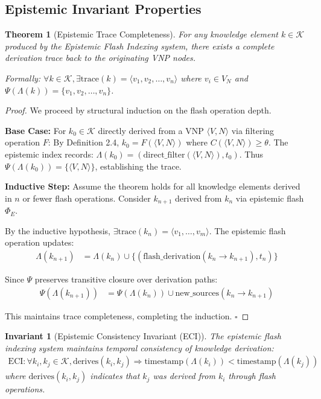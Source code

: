 \documentclass[12pt]{article}
\newtheorem{theorem}{Theorem}
\newtheorem{invariant}{Invariant}
\begin{document}
\subsection{Epistemic Invariant Properties}

\begin{theorem}[Epistemic Trace Completeness]
For any knowledge element $k \in \mathcal{K}$ produced by the Epistemic Flash Indexing system, there exists a complete derivation trace back to the originating VNP nodes.

Formally: $\forall k \in \mathcal{K}, \exists \text{trace}(k) = \langle v_1, v_2, \ldots, v_n \rangle$ where $v_i \in V_N$ and $\Psi(\Lambda(k)) = \{v_1, v_2, \ldots, v_n\}$.
\end{theorem}

\begin{proof}
We proceed by structural induction on the flash operation depth.

\textbf{Base Case:} For $k_0 \in \mathcal{K}$ directly derived from a VNP $\langle V, N \rangle$ via filtering operation $F$:
By Definition 2.4, $k_0 = F(\langle V, N \rangle)$ where $C(\langle V, N \rangle) \geq \theta$.
The epistemic index records: $\Lambda(k_0) = (\text{direct\_filter}(\langle V, N \rangle), t_0)$.
Thus $\Psi(\Lambda(k_0)) = \{\langle V, N \rangle\}$, establishing the trace.

\textbf{Inductive Step:} Assume the theorem holds for all knowledge elements derived in $n$ or fewer flash operations. Consider $k_{n+1}$ derived from $k_n$ via epistemic flash $\Phi_E$.

By the inductive hypothesis, $\exists \text{trace}(k_n) = \langle v_1, \ldots, v_m \rangle$.
The epistemic flash operation updates:
\begin{align}
\Lambda(k_{n+1}) &= \Lambda(k_n) \cup \{(\text{flash\_derivation}(k_n \rightarrow k_{n+1}), t_n)\}
\end{align}

Since $\Psi$ preserves transitive closure over derivation paths:
\begin{align}
\Psi(\Lambda(k_{n+1})) &= \Psi(\Lambda(k_n)) \cup \text{new\_sources}(k_n \rightarrow k_{n+1})
\end{align}

This maintains trace completeness, completing the induction. $\square$
\end{proof}

\begin{invariant}[Epistemic Consistency Invariant (ECI)]
The epistemic flash indexing system maintains temporal consistency of knowledge derivation:
\begin{align}
\text{ECI}: \forall k_i, k_j \in \mathcal{K}, \text{derives}(k_i, k_j) \Rightarrow \text{timestamp}(\Lambda(k_i)) < \text{timestamp}(\Lambda(k_j))
\end{align}
where $\text{derives}(k_i, k_j)$ indicates that $k_j$ was derived from $k_i$ through flash operations.
\end{invariant}
\end{document}
